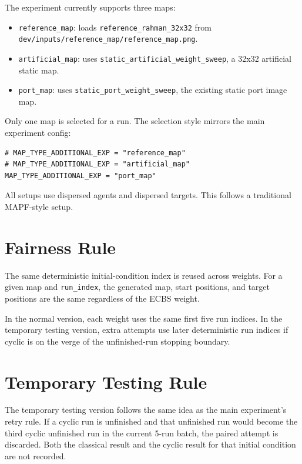 \documentclass[11pt]{article}
\begin{document}
The experiment currently supports three maps:

\begin{itemize}[leftmargin=2em]
    \item \texttt{reference\_map}: loads \texttt{reference\_rahman\_32x32} from \texttt{dev/inputs/reference\_map/reference\_map.png}.
    \item \texttt{artificial\_map}: uses \texttt{static\_artificial\_weight\_sweep}, a 32x32 artificial static map.
    \item \texttt{port\_map}: uses \texttt{static\_port\_weight\_sweep}, the existing static port image map.
\end{itemize}

Only one map is selected for a run. The selection style mirrors the main experiment config:

\begin{lstlisting}
# MAP_TYPE_ADDITIONAL_EXP = "reference_map"
# MAP_TYPE_ADDITIONAL_EXP = "artificial_map"
MAP_TYPE_ADDITIONAL_EXP = "port_map"
\end{lstlisting}

All setups use dispersed agents and dispersed targets. This follows a traditional MAPF-style setup.

\section{Fairness Rule}

The same deterministic initial-condition index is reused across weights. For a given map and \texttt{run\_index}, the generated map, start positions, and target positions are the same regardless of the ECBS weight.

In the normal version, each weight uses the same first five run indices. In the temporary testing version, extra attempts use later deterministic run indices if cyclic is on the verge of the unfinished-run stopping boundary.

\section{Temporary Testing Rule}

The temporary testing version follows the same idea as the main experiment's retry rule. If a cyclic run is unfinished and that unfinished run would become the third cyclic unfinished run in the current 5-run batch, the paired attempt is discarded. Both the classical result and the cyclic result for that initial condition are not recorded.
\end{document}

